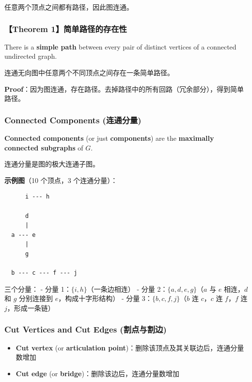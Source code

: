 \documentclass[10pt,a4paper,openany]{ctexbook}
\theoremstyle{definition}
\theoremstyle{remark}
\renewenvironment{quote}
  {\list{}{\leftmargin=1em\rightmargin=0pt\topsep=0.5pt\partopsep=0pt}\item[]}
  {\endlist}
\begin{document}
任意两个顶点之间都有路径，因此图连通。
\subsubsection{【Theorem 1】简单路径的存在性}

\begin{quote}
There is a \textbf{simple path} between every pair of distinct vertices of a connected undirected graph.

连通无向图中任意两个不同顶点之间存在一条简单路径。

\textbf{Proof}：因为图连通，存在路径。去掉路径中的所有回路（冗余部分），得到简单路径。

\end{quote}

\subsubsection{Connected Components (连通分量)}

\textbf{Connected components} (or just \textbf{components}) are the \textbf{maximally connected subgraphs} of $G$.
\begin{quote}
连通分量是图的极大连通子图。

\textbf{示例图}（10 个顶点，3 个连通分量）：
{\footnotesize\begin{verbatim}
      i --- h
    
      d
      |
  a --- e
      |
      g
    
  b --- c --- f --- j
\end{verbatim}}

三个分量：
- 分量 1：$\{i, h\}$（一条边相连）
- 分量 2：$\{a, d, e, g\}$（$a$ 与 $e$ 相连，$d$ 和 $g$ 分别连接到 $e$，构成十字形结构）
- 分量 3：$\{b, c, f, j\}$（$b$ 连 $c$，$c$ 连 $f$，$f$ 连 $j$，形成一条链）

\end{quote}

\subsubsection{Cut Vertices and Cut Edges (割点与割边)}

\begin{itemize}
\item \textbf{Cut vertex} (or \textbf{articulation point})：删除该顶点及其关联边后，连通分量数增加
\item \textbf{Cut edge} (or \textbf{bridge})：删除该边后，连通分量数增加

\end{itemize}
\end{document}
